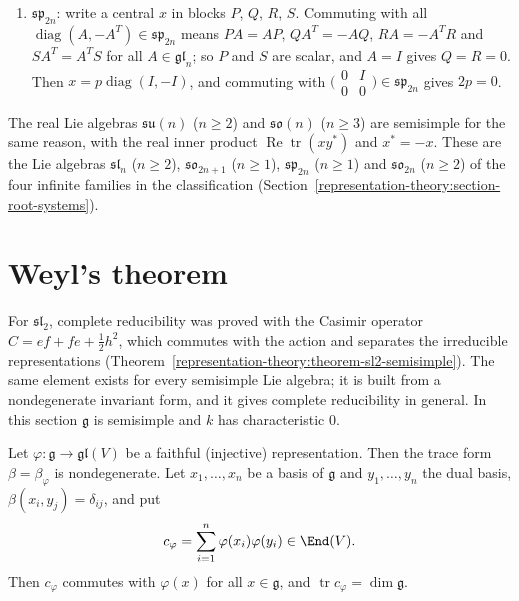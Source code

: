 \begin{example}
\begin{enumerate}
preserves $\operatorname{span}(e_i, e_j) \cap \operatorname{span}(e_i, e_l) = \CC e_i$; so $x$ is diagonal, and a diagonal skew-symmetric matrix is $0$. (For $n = 2$,
$\mathfrak{so}_2$ is one-dimensional, hence abelian.)
\item $\mathfrak{sp}_{2n}$: write a central $x$ in blocks $P$, $Q$, $R$, $S$. Commuting with all $\operatorname{diag}(A, -A^T) \in \mathfrak{sp}_{2n}$ means $PA = AP$,
$QA^T = -AQ$, $RA = -A^TR$ and $SA^T = A^TS$ for all $A \in \mathfrak{gl}_n$; so $P$ and $S$ are scalar, and $A = I$ gives $Q = R = 0$. Then $x = p\operatorname{diag}(I, -I)$, and
commuting with $\bigl(\begin{smallmatrix}0 & I\\ 0 & 0\end{smallmatrix}\bigr) \in \mathfrak{sp}_{2n}$ gives $2p = 0$.
\end{enumerate}
The real Lie algebras $\mathfrak{su}(n)$ ($n \geq 2$) and $\mathfrak{so}(n)$ ($n \geq 3$) are semisimple for the same reason, with the real inner product
$\operatorname{Re}\operatorname{tr}(xy^*)$ and $x^* = -x$. These are the Lie algebras $\mathfrak{sl}_n$ ($n \geq 2$), $\mathfrak{so}_{2n+1}$ ($n \geq 1$), $\mathfrak{sp}_{2n}$
($n \geq 1$) and $\mathfrak{so}_{2n}$ ($n \geq 2$) of the four infinite families in the classification (Section~\ref{representation-theory:section-root-systems}).
\end{example}

\section{Weyl's theorem}\label{representation-theory:section-weyl}

For $\mathfrak{sl}_2$, complete reducibility was proved with the Casimir operator $C = ef + fe + \frac12h^2$, which commutes with the action and separates the irreducible
representations (Theorem~\ref{representation-theory:theorem-sl2-semisimple}). The same element exists for every semisimple Lie algebra; it is built from a nondegenerate invariant
form, and it gives complete reducibility in general. In this section $\mathfrak{g}$ is semisimple and $k$ has characteristic $0$.

\begin{lemma}\label{representation-theory:lemma-casimir}
Let $\varphi \colon \mathfrak{g} \to \mathfrak{gl}(V)$ be a faithful (injective) representation. Then the trace form $\beta = \beta_\varphi$ is nondegenerate. Let $x_1, \ldots, x_n$ be
a basis of $\mathfrak{g}$ and $y_1, \ldots, y_n$ the dual basis, $\beta(x_i, y_j) = \delta_{ij}$, and put
\[
c_\varphi = \sum_{i=1}^n\varphi(x_i)\varphi(y_i) \in \End(V).
\]
Then $c_\varphi$ commutes with $\varphi(x)$ for all $x \in \mathfrak{g}$, and $\operatorname{tr}c_\varphi = \dim\mathfrak{g}$.
\end{lemma}

